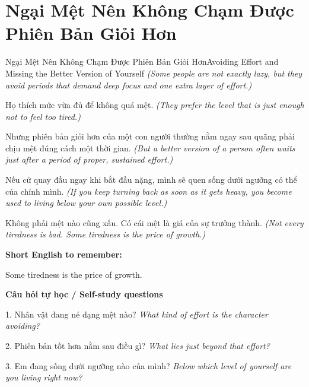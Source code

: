 \section{Ngại Mệt Nên Không Chạm Được Phiên Bản Giỏi Hơn}
\begin{truyen}{Ngại Mệt Nên Không Chạm Được Phiên Bản Giỏi Hơn}{Avoiding Effort and Missing the Better Version of Yourself}
\textit{(Some people are not exactly lazy, but they avoid periods that demand deep focus and one extra layer of effort.)}

Họ thích mức vừa đủ để không quá mệt.
\textit{(They prefer the level that is just enough not to feel too tired.)}

Nhưng phiên bản giỏi hơn của một con người thường nằm ngay sau quãng phải chịu mệt đúng cách một thời gian.
\textit{(But a better version of a person often waits just after a period of proper, sustained effort.)}

Nếu cứ quay đầu ngay khi bắt đầu nặng, mình sẽ quen sống dưới ngưỡng có thể của chính mình.
\textit{(If you keep turning back as soon as it gets heavy, you become used to living below your own possible level.)}

\end{truyen}

\begin{baihoc}
Không phải mệt nào cũng xấu. Có cái mệt là giá của sự trưởng thành.
\textit{(Not every tiredness is bad. Some tiredness is the price of growth.)}
\end{baihoc}

\begin{ghinhoanh}
\textbf{Short English to remember:}

Some tiredness is the price of growth.

\end{ghinhoanh}

\begin{tuhocnhanh}
\textbf{Câu hỏi tự học / Self-study questions}

1. Nhân vật đang né dạng mệt nào? \textit{What kind of effort is the character avoiding?}

2. Phiên bản tốt hơn nằm sau điều gì? \textit{What lies just beyond that effort?}

3. Em đang sống dưới ngưỡng nào của mình? \textit{Below which level of yourself are you living right now?}
\end{tuhocnhanh}
